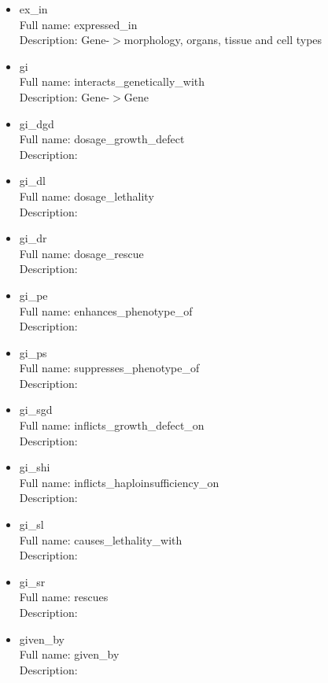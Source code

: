 \begin{itemize}
\item{ex\_in}\\ Full name: expressed\_in\\ Description: Gene-$>$morphology, organs, tissue and cell types 

\item{gi}\\ Full name: interacts\_genetically\_with\\ Description: Gene-$>$Gene 

\item{gi\_dgd}\\ Full name: dosage\_growth\_defect\\ Description: 

\item{gi\_dl}\\ Full name: dosage\_lethality\\ Description: 

\item{gi\_dr}\\ Full name: dosage\_rescue\\ Description: 

\item{gi\_pe}\\ Full name: enhances\_phenotype\_of\\ Description: 

\item{gi\_ps}\\ Full name: suppresses\_phenotype\_of\\ Description: 

\item{gi\_sgd}\\ Full name: inflicts\_growth\_defect\_on\\ Description: 

\item{gi\_shi}\\ Full name: inflicts\_haploinsufficiency\_on\\ Description: 

\item{gi\_sl}\\ Full name: causes\_lethality\_with\\ Description: 

\item{gi\_sr}\\ Full name: rescues\\ Description: 

\item{given\_by}\\ Full name: given\_by\\ Description: 


\end{itemize}

